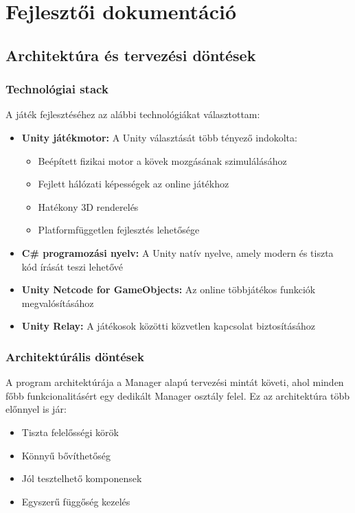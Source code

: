 \chapter{Fejlesztői dokumentáció}
\label{ch:impl}

\section{Architektúra és tervezési döntések}

\subsection{Technológiai stack}
A játék fejlesztéséhez az alábbi technológiákat választottam:

\begin{itemize}
	\item \textbf{Unity játékmotor:} A Unity választását több tényező indokolta:
	\begin{itemize}
		\item Beépített fizikai motor a kövek mozgásának szimulálásához
		\item Fejlett hálózati képességek az online játékhoz
		\item Hatékony 3D renderelés
		\item Platformfüggetlen fejlesztés lehetősége
	\end{itemize}
	\item \textbf{C\# programozási nyelv:} A Unity natív nyelve, amely modern és tiszta kód írását teszi lehetővé
	\item \textbf{Unity Netcode for GameObjects:} Az online többjátékos funkciók megvalósításához
	\item \textbf{Unity Relay:} A játékosok közötti közvetlen kapcsolat biztosításához
\end{itemize}

\subsection{Architektúrális döntések}
A program architektúrája a Manager alapú tervezési mintát követi, ahol minden főbb funkcionalitásért egy dedikált Manager osztály felel. Ez az architektúra több előnnyel is jár:

\begin{itemize}
	\item Tiszta felelősségi körök
	\item Könnyű bővíthetőség
	\item Jól tesztelhető komponensek
	\item Egyszerű függőség kezelés
\end{itemize}

